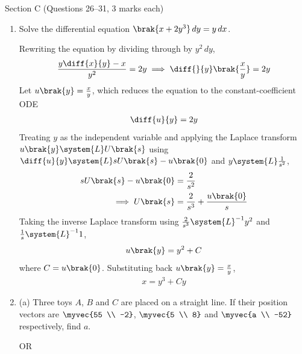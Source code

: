 \vspace{2mm}
\noindent Section C (Questions 26--31, 3 marks each)
\begin{enumerate}[label=\thesubsection.\arabic*, ref=\thesubsection.\theenumi, start=26]





\item Solve the differential equation $\brak{x + 2y^3}\,dy = y\,dx$.
\par\solution
Rewriting the equation by dividing through by $y^2\,dy$,
\begin{align}
	\frac{y\diff{x}{y} - x}{y^2} = 2y \implies \diff{}{y}\brak{\frac{x}{y}} = 2y
\end{align}
Let $u\brak{y} = \frac{x}{y}$, which reduces the equation to the constant-coefficient ODE
\begin{align}
	\diff{u}{y} = 2y
\end{align}
Treating $y$ as the independent variable and applying the Laplace transform $u\brak{y} \system{L} U\brak{s}$ using $\diff{u}{y} \system{L} sU\brak{s} - u\brak{0}$ and $y \system{L} \frac{1}{s^2}$,
\begin{align}
	sU\brak{s} - u\brak{0} &= \frac{2}{s^2}
	\\
	\implies U\brak{s} &= \frac{2}{s^3} + \frac{u\brak{0}}{s}
\end{align}
Taking the inverse Laplace transform using $\frac{2}{s^3} \system{L}^{-1} y^2$ and $\frac{1}{s} \system{L}^{-1} 1$,
\begin{align}
	u\brak{y} = y^2 + C
\end{align}
where $C = u\brak{0}$. Substituting back $u\brak{y} = \frac{x}{y}$,
\begin{align}
	x = y^3 + Cy
\end{align}
















\item 
(a) Three toys $A$, $B$ and $C$ are placed on a straight line. If their position vectors are $\myvec{55 \\ -2}$, $\myvec{5 \\ 8}$ and $\myvec{a \\ -52}$ respectively, find $a$.

OR


\end{enumerate}
